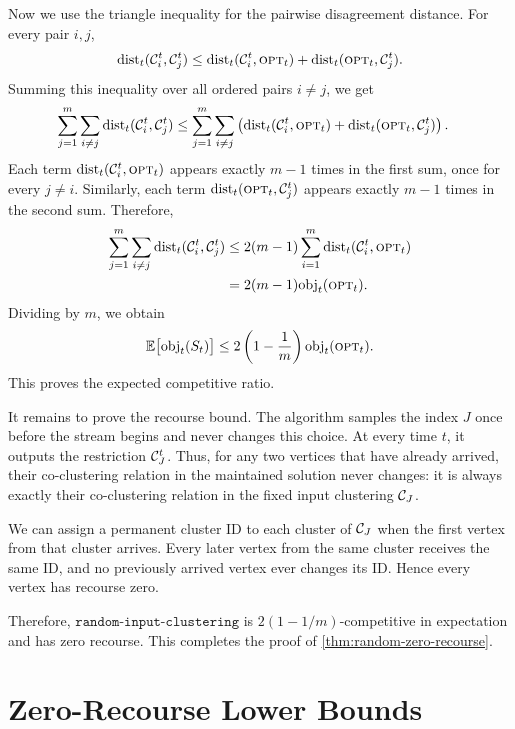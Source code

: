 Now we use the triangle inequality for the pairwise disagreement distance. For every pair \(i,j\),
\[
    \text{dist}_t(\mathcal{C}_i^t,\mathcal{C}_j^t)
    \le
    \text{dist}_t(\mathcal{C}_i^t,\textsc{opt}_t)
    +
    \text{dist}_t(\textsc{opt}_t,\mathcal{C}_j^t).
\]
Summing this inequality over all ordered pairs \(i\neq j\), we get
\[
\begin{aligned}
    \sum_{j=1}^m
    \sum_{i\neq j}
    \text{dist}_t(\mathcal{C}_i^t,\mathcal{C}_j^t)
    &\le
    \sum_{j=1}^m
    \sum_{i\neq j}
    \left(
        \text{dist}_t(\mathcal{C}_i^t,\textsc{opt}_t)
        +
        \text{dist}_t(\textsc{opt}_t,\mathcal{C}_j^t)
    \right).
\end{aligned}
\]
Each term \(\text{dist}_t(\mathcal{C}_i^t,\textsc{opt}_t)\) appears exactly \(m-1\) times in the first sum, once for every \(j\neq i\). Similarly, each term \(\text{dist}_t(\textsc{opt}_t,\mathcal{C}_j^t)\) appears exactly \(m-1\) times in the second sum. Therefore,
\[
\begin{aligned}
    \sum_{j=1}^m
    \sum_{i\neq j}
    \text{dist}_t(\mathcal{C}_i^t,\mathcal{C}_j^t)
    &\le
    2(m-1)
    \sum_{i=1}^m
    \text{dist}_t(\mathcal{C}_i^t,\textsc{opt}_t)\\
    &=
    2(m-1)\text{obj}_t(\textsc{opt}_t).
\end{aligned}
\]
Dividing by \(m\), we obtain
\[
    \mathbb{E}\bigl[\text{obj}_t(S_t)\bigr]
    \le
    2\left(1-\frac1m\right)\text{obj}_t(\textsc{opt}_t).
\]
This proves the expected competitive ratio.

It remains to prove the recourse bound. The algorithm samples the index \(J\) once before the stream begins and never changes this choice. At every time \(t\), it outputs the restriction \(\mathcal{C}_J^t\). Thus, for any two vertices that have already arrived, their co-clustering relation in the maintained solution never changes: it is always exactly their co-clustering relation in the fixed input clustering \(\mathcal{C}_J\).

We can assign a permanent cluster ID to each cluster of \(\mathcal{C}_J\) when the first vertex from that cluster arrives. Every later vertex from the same cluster receives the same ID, and no previously arrived vertex ever changes its ID. Hence every vertex has recourse zero.

Therefore, \(\texttt{random-input-clustering}\) is \(2(1-1/m)\)-competitive in expectation and has zero recourse. This completes the proof of \cref{thm:random-zero-recourse}.

\section{Zero-Recourse Lower Bounds}

